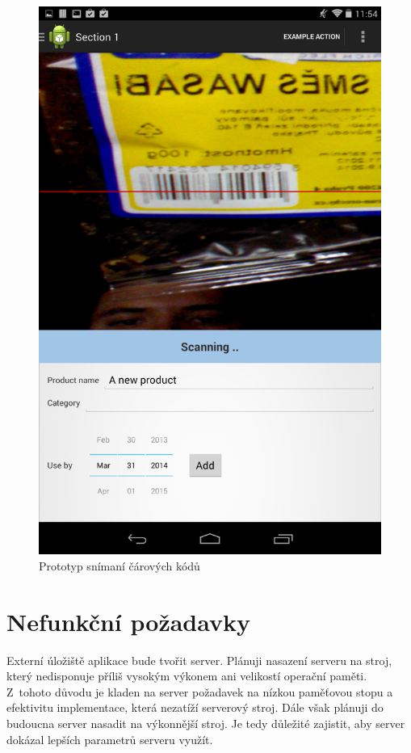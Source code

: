 \documentclass[thesis=B,czech]{FITthesis}[2013/10/20]
\begin{document}
\begin{figure}[H]
  \centering
  \includegraphics[scale=0.3]{screenshots/scan_prototype.png}
  \caption{Prototyp snímaní čárových kódů}
  \label{fig:ScanPrototype}
\end{figure}

\section{Nefunkční požadavky}

Externí úložiště aplikace bude tvořit server. Plánuji nasazení serveru na stroj, který nedisponuje příliš vysokým výkonem ani velikostí operační paměti. Z~tohoto důvodu je kladen na server požadavek na nízkou paměťovou stopu a efektivitu implementace, která nezatíží serverový stroj. Dále však plánuji do budoucna server nasadit na výkonnější stroj. Je tedy důležité zajistit, aby server dokázal lepších parametrů serveru využít.
\end{document}
